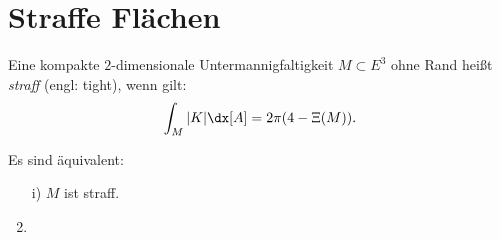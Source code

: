 \chapter{Straffe Flächen}


\begin{df}
	Eine kompakte $2$-dimensionale Untermannigfaltigkeit $M \subset E^3$ ohne Rand heißt \emph{straff} (engl: tight), wenn gilt:
	\[ \int_M | K | \dx[A] = 2 \pi (4 - \Xi (M)). \]

\end{df}

\begin{st}
	Es sind äquivalent: 
	\begin{enumerate}
		\item[i)]  $M$ ist straff.
		\item 
	\end{enumerate}

\end{st}